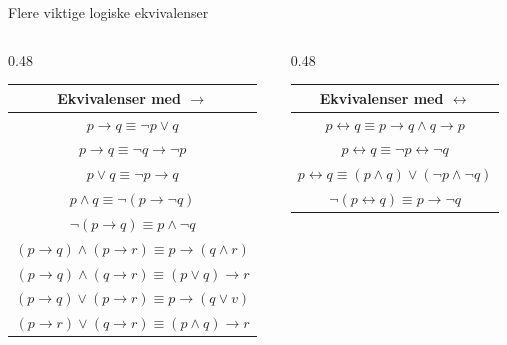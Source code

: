 \begin{frame}{Flere viktige logiske ekvivalenser}
    \begin{columns}
    \begin{column}{0.48\textwidth}
        \begin{tabular}{c}
            Ekvivalenser med $\rightarrow$ \\ \hline
            $p \rightarrow q \equiv \lnot p \lor q$ \\
            $p \rightarrow q \equiv \lnot q \rightarrow \lnot p$ \\
            $p \lor q \equiv \lnot p \rightarrow q$ \\
            $p \land q \equiv \lnot (p \rightarrow \lnot q)$ \\
            $\lnot (p \rightarrow q) \equiv p \land \lnot q$ \\
            $(p \rightarrow q) \land (p \rightarrow r) \equiv p \rightarrow (q \land r)$ \\
            $(p \rightarrow q) \land (q \rightarrow r) \equiv (p \lor q) \rightarrow r$ \\
            $(p \rightarrow q) \lor (p \rightarrow r) \equiv p \rightarrow (q \lor v)$ \\
            $(p \rightarrow r) \lor (q \rightarrow r) \equiv (p \land q) \rightarrow r$
        \end{tabular}
    \end{column}
    \begin{column}{0.48\textwidth}
        \begin{tabular}{c}
            Ekvivalenser med $\leftrightarrow$ \\ \hline
            $p \leftrightarrow q \equiv p \rightarrow q \land q \rightarrow p$ \\
            $p \leftrightarrow q \equiv \lnot p \leftrightarrow \lnot q$ \\
            $p \leftrightarrow q \equiv (p \land q) \lor (\lnot p \land \lnot q)$\\
            $\lnot (p \leftrightarrow q) \equiv p \rightarrow \lnot q$
        \end{tabular}
    \end{column}
    \end{columns}
\end{frame}

